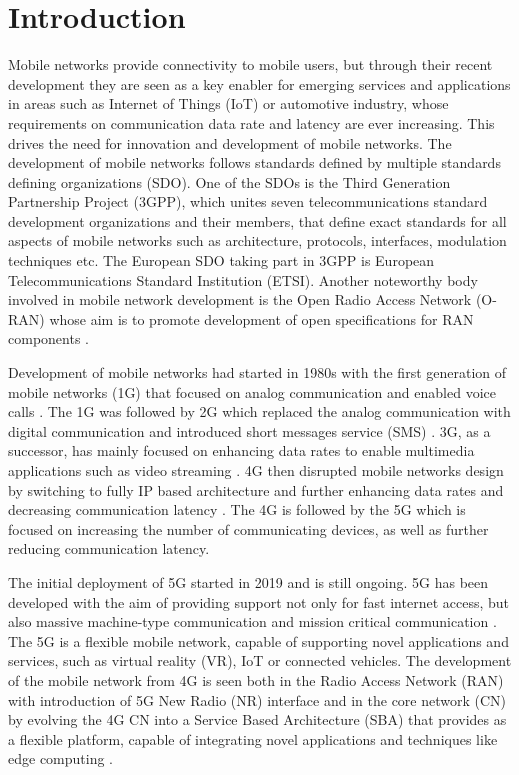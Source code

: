\documentclass[12pt,a4paper,twoside]{report}
\begin{document}
\setcounter{page}{1}

\chapter{Introduction}
Mobile networks provide connectivity to mobile users, but through their recent development they are seen as a key enabler for emerging services and applications in areas such as Internet of Things (IoT) or automotive industry, whose requirements on communication data rate and latency are ever increasing. This drives the need for innovation and development of mobile networks. The development of mobile networks follows standards defined by multiple standards defining organizations (SDO). One of the SDOs is the Third Generation Partnership Project (3GPP), which unites seven telecommunications standard development organizations and their members, that define exact standards for all aspects of mobile networks such as architecture, protocols, interfaces, modulation techniques etc. The European SDO taking part in 3GPP is European Telecommunications Standard Institution (ETSI). Another noteworthy body involved in mobile network development is the Open Radio Access Network (O-RAN) whose aim is to promote development of open specifications for RAN components \cite{o-ran-web}. 

Development of mobile networks had started in 1980s with the first generation of mobile networks (1G) that focused on analog communication and enabled voice calls \cite{sauter2017history}. The 1G was followed by 2G which replaced the analog communication with digital communication and introduced short messages service (SMS) \cite{sauter2017history}. 3G, as a successor, has mainly focused on enhancing data rates to enable multimedia applications such as video streaming \cite{sauter2017history}. 4G then disrupted mobile networks design by switching to fully IP based architecture and further enhancing data rates and decreasing communication latency \cite{sauter2017history,dahlman-2013-4g}. The 4G is followed by the 5G which is focused on increasing the number of communicating devices, as well as further reducing communication latency. 

The initial deployment of 5G started in 2019 and is still ongoing. 5G has been developed with the aim of providing support not only for fast internet access, but also massive machine-type communication and mission critical communication \cite{dahlman-2020-5g}. The 5G is a flexible mobile network, capable of supporting novel applications and services, such as virtual reality (VR), IoT or connected vehicles. The development of the mobile network from 4G is seen both in the Radio Access Network (RAN) with introduction of 5G New Radio (NR) interface and in the core network (CN) by evolving the 4G CN into a Service Based Architecture (SBA) that provides as a flexible platform, capable of integrating novel applications and techniques like edge computing \cite{sabella-mec-sw-dev}. 
\end{document}

